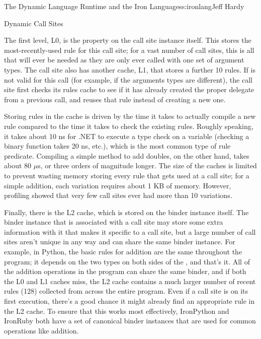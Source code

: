 \begin{aosachapter}{The Dynamic Language Runtime and the Iron Languages}{s:ironlang}{Jeff Hardy}
\begin{aosasect1}{Dynamic Call Sites}

The first level, L0, is the  property on the call site
instance itself. This stores the most-recently-used rule for this call site;
for a vast number of call sites, this is all that will ever be needed as they
are only ever called with one set of argument types. The call site also has
another cache, L1, that stores a further 10 rules. If  is not
valid for this call (for example, if the arguments types are different), the
call site first checks its rules cache to see if it has already created the
proper delegate from a previous call, and reuses that rule instead of creating
a new one.

Storing rules in the cache is driven by the time it takes to actually compile a
new rule compared to the time it takes to check the existing rules. Roughly
speaking, it takes about 10 ns for .NET to execute a type check on a variable
(checking a binary function takes 20 ns, etc.), which is the most common type
of rule predicate. Compiling a simple method to add doubles, on the other hand,
takes about 80 $\mu$s, or three orders of magnitude longer. The size of the caches
is limited to prevent wasting memory storing every rule that gets used at a
call site; for a simple addition, each variation requires about 1 KB of memory.
However, profiling showed that very few call sites ever had more than 10
variations.

Finally, there is the L2 cache, which is stored on the binder instance itself.
The binder instance that is associated with a call site may store some extra
information with it that makes it specific to a call site, but a large number
of call sites aren't unique in any way and can share the same binder instance.
For example, in Python, the basic rules for addition are the same throughout
the program; it depends on the two types on both sides of the \code{+},
and that's it. All of the addition operations in the program can share the same
binder, and if both the L0 and L1 caches miss, the L2 cache contains a much
larger number of recent rules (128) collected from across the entire program.
Even if a call site is on its first execution, there's a good chance it might
already find an appropriate rule in the L2 cache. To ensure that this works
most effectively, IronPython and IronRuby both have a set of canonical binder
instances that are used for common operations like addition.


\end{aosasect1}
\end{aosachapter}
